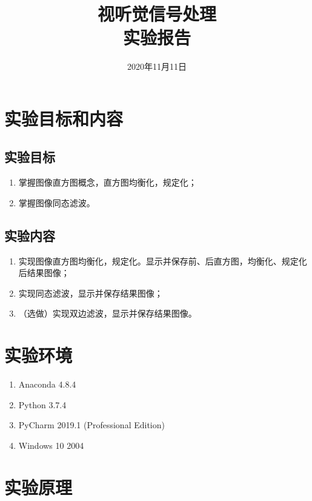 \documentclass{hitreport}
\title{视听觉信号处理\\实验报告}
\date{2020年11月11日}
\begin{document}
\maketitle

\tableofcontents
\newpage




\section{实验目标和内容}

\subsection{实验目标}
\begin{enumerate}
\item 掌握图像直方图概念，直方图均衡化，规定化；
\item 掌握图像同态滤波。
\end{enumerate}

\subsection{实验内容}
\begin{enumerate}
\item 实现图像直方图均衡化，规定化。显示并保存前、后直方图，均衡化、规定化后结果图像；
\item 实现同态滤波，显示并保存结果图像；
\item （选做）实现双边滤波，显示并保存结果图像。
\end{enumerate}

\section{实验环境}

\begin{enumerate}
\item Anaconda 4.8.4
\item Python 3.7.4
\item PyCharm 2019.1 (Professional Edition)
\item Windows 10 2004
\end{enumerate}

\section{实验原理}
\end{document}
